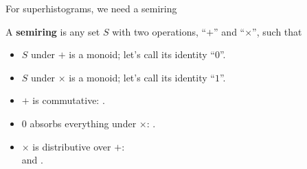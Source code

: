\documentclass[aspectratio=169]{beamer}
\begin{document}
\begin{frame}{For superhistograms, we need a semiring}
\large
\vspace{0.5 cm}

A {\bf semiring} is any set $S$ with two operations, ``$+$'' and ``$\times$'', such that

\vspace{0.25 cm}
\begin{center}
\begin{minipage}{0.9\linewidth}
\begin{itemize}
\item $S$ under $+$ is a monoid; let's call its identity ``$0$''.
\item $S$ under $\times$ is a monoid; let's call its identity ``$1$''.
\item $+$ is commutative: .
\item $0$ absorbs everything under $\times$: .
\item $\times$ is distributive over $+$:  \\ \hfill and .\mbox{\hspace{1.525 cm}}
\end{itemize}
\end{minipage}
\end{center}

\vspace{0.5 cm}
\end{frame}
\end{document}
